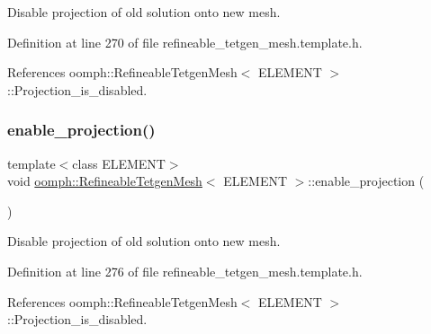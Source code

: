 Disable projection of old solution onto new mesh. 



Definition at line 270 of file refineable\+\_\+tetgen\+\_\+mesh.\+template.\+h.



References oomph\+::\+Refineable\+Tetgen\+Mesh$<$ E\+L\+E\+M\+E\+N\+T $>$\+::\+Projection\+\_\+is\+\_\+disabled.

\mbox{\label{classoomph_1_1RefineableTetgenMesh_a7fabe6ae591918c313213fd0528e21d1}} 
\subsubsection{\texorpdfstring{enable\+\_\+projection()}{enable\_projection()}}
{\footnotesize\ttfamily template$<$class E\+L\+E\+M\+E\+NT$>$ \\
void \hyperlink{classoomph_1_1RefineableTetgenMesh}{oomph\+::\+Refineable\+Tetgen\+Mesh}$<$ E\+L\+E\+M\+E\+NT $>$\+::enable\+\_\+projection (\begin{DoxyParamCaption}{ }\end{DoxyParamCaption})\hspace{0.3cm}{\ttfamily [inline]}}



Disable projection of old solution onto new mesh. 



Definition at line 276 of file refineable\+\_\+tetgen\+\_\+mesh.\+template.\+h.



References oomph\+::\+Refineable\+Tetgen\+Mesh$<$ E\+L\+E\+M\+E\+N\+T $>$\+::\+Projection\+\_\+is\+\_\+disabled.

\mbox{\label{classoomph_1_1RefineableTetgenMesh_a78ed78a656617d294c73118eda904253}} 
